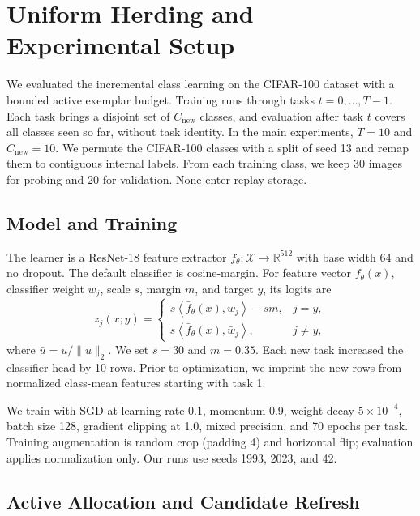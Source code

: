 \section{Uniform Herding and Experimental Setup}
\label{sec:method}

We evaluated the incremental class learning on the CIFAR-100 dataset with a bounded active exemplar budget.  Training runs through tasks $t=0,\ldots,T-1$. Each task brings a disjoint set of $C_{\mathrm{new}}$ classes, and evaluation after task $t$ covers all classes seen so far, without task identity. In the main experiments, $T=10$ and $C_{\mathrm{new}}=10$.  We permute the CIFAR-100
classes with a split of seed 13 and remap them to contiguous internal labels.  From each training class, we keep 30 images for probing and 20 for validation. None enter replay storage.



\subsection{Model and Training}
\label{subsec:model-training}

The learner is a ResNet-18 feature extractor $f_\theta:\mathcal{X}\to
\mathbb{R}^{512}$ with base width 64 and no dropout.  The default classifier
is cosine-margin.  For feature vector $f_\theta(x)$, classifier
weight $w_j$, scale $s$, margin $m$, and target $y$, its logits are
\[
z_j(x;y)=
\begin{cases}
s\left\langle \bar f_\theta(x),\bar w_j\right\rangle-sm, & j=y,\\
s\left\langle \bar f_\theta(x),\bar w_j\right\rangle, & j\neq y,
\end{cases}
\]
where $\bar u=u/\|u\|_2$.  We set $s=30$ and $m=0.35$.  Each new task
increased the classifier head by 10 rows.  Prior to optimization, we imprint the new rows from normalized class-mean features starting with task 1.

We train with SGD at learning rate 0.1, momentum 0.9, weight decay
$5\times10^{-4}$, batch size 128, gradient clipping at 1.0, mixed precision,
and 70 epochs per task.  Training augmentation is random crop (padding 4) and
horizontal flip; evaluation applies normalization only.  Our runs use seeds
1993, 2023, and 42.

\subsection{Active Allocation and Candidate Refresh}
\label{subsec:active-candidate-memory}

